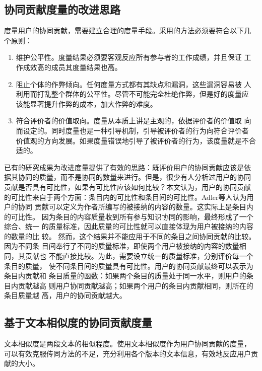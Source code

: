 \subsection{协同贡献度量的改进思路}
度量用户的协同贡献，需要建立合理的度量手段。采用的方法必须要符合以下几
个原则：

\begin{enumerate}
\item 维护公平性。度量结果必须要客观反应所有参与者的工作成绩，并且保证
  工作成效高的成员其度量结果也高。
\item 阻止个体的作弊倾向。任何度量方式都有其缺点和漏洞，这些漏洞容易被
  人利用而打乱整个群体的公平性。尽管不可能完全杜绝作弊，但是好的度量应
  该能显著提升作弊的成本，加大作弊的难度。
\item 符合评价者的价值取向。度量从本质上讲是主观的，依据评价者的价值取
  向而设定的。同时度量也是一种引导机制，引导被评价者的行为向符合评价者
  价值观的方向发展。如果度量错误地引导了被评价者的行为，该度量就是不合
  适的。
\end{enumerate}

已有的研究成果为改进度量提供了有效的思路：既评价用户的协同贡献应该是依
据其协同的质量，而不是协同的数量来进行。但是，很少有人分析过用户的协同
贡献是否具有可比性，如果有可比性应该如何比较？本文认为，用户的协同贡献
的可比性来自于两个方面：条目内的可比性和条目间的可比性。Adler等人认为用户的协同
贡献可以定义为作者所编写的被接纳的内容的数量。这实际上是条目内的可比性。
因为条目的内容质量收到所有参与知识协同的影响，最终形成了一个综合、统一
的质量标准，因此质量的可比性就可以直接体现为用户被接纳的内容的数量的比
较。
然而，这个结果并不能应用于不同的条目之间协同贡献的比较。因为不同条
目间奉行了不同的质量标准，即使两个用户被接纳的内容的数量相同，其贡献也
不能直接比较。为此，需要设立统一的质量标准，分别评价每一个条目的质量，
使不同条目间的质量具有可比性。用户的协同贡献最终可以表示为条目内贡献和
条目质量的函数：如果两个条目的质量处于同一水平，则用户的条目内贡献越高
则用户协同贡献越高；如果两个用户的条目内贡献相同，则所在的条目质量越
高，用户的协同贡献越大。



\subsection{基于文本相似度的协同贡献度量}

文本相似度是两段文本的相似程度。使用文本相似度作为用户协同贡献的度量，
可以有效克服传同方法的不足，充分利用各个版本的文本信息，有效地反应用户贡
献的大小。

